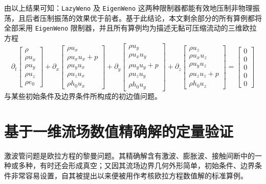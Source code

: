 由以上结果可知：\texttt{LazyWeno} 及 \texttt{EigenWeno} 这两种限制器都能有效地压制非物理振荡，且后者压制振荡的效果优于前者。基于此结论，本文剩余部分的所有算例都将全部采用
\texttt{EigenWeno} 限制器，并且所有算例均为描述无黏可压缩流动的三维欧拉方程
\begin{equation}
\partial_{t}\begin{bmatrix}\rho\\
\rho u_{x}\\
\rho u_{y}\\
\rho u_{z}\\
\rho e_{0}
\end{bmatrix}+\partial_{x}\begin{bmatrix}\rho u_{x}\\
\rho u_{x}u_{x}+p\\
\rho u_{y}u_{x}\\
\rho u_{z}u_{x}\\
\rho h_{0}u_{x}
\end{bmatrix}+\partial_{y}\begin{bmatrix}\rho u_{y}\\
\rho u_{x}u_{y}\\
\rho u_{y}u_{y}+p\\
\rho u_{z}u_{y}\\
\rho h_{0}u_{y}
\end{bmatrix}+\partial_{z}\begin{bmatrix}\rho u_{z}\\
\rho u_{x}u_{z}\\
\rho u_{y}u_{z}\\
\rho u_{z}u_{z}+p\\
\rho h_{0}u_{z}
\end{bmatrix}=\begin{bmatrix}0\\
0\\
0\\
0\\
0
\end{bmatrix}\label{eq:euler_system}
\end{equation}
与某些初始条件及边界条件所构成的初边值问题。

\section{基于一维流场数值精确解的定量验证}

激波管问题是欧拉方程的黎曼问题。其精确解含有激波、膨胀波、接触间断中的一种或多种，有时还会形成真空；又因其流场边界几何外形简单，初始条件、边界条件非常容易设置，自其被提出以来便被用作考核欧拉方程数值解的标准算例。

